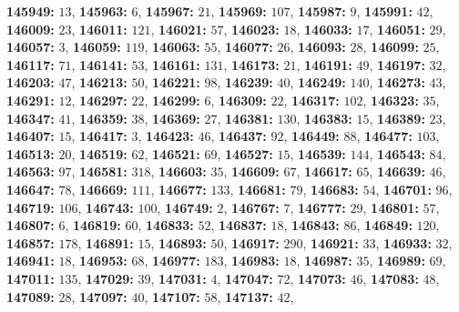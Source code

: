 \textsf{\bfseries 145949:} $13$, \textsf{\bfseries 145963:} $6$, \textsf{\bfseries 145967:} $21$, \textsf{\bfseries 145969:} $107$, \textsf{\bfseries 145987:} $9$, \textsf{\bfseries 145991:} $42$, \textsf{\bfseries 146009:} $23$, \textsf{\bfseries 146011:} $121$, \textsf{\bfseries 146021:} $57$, \textsf{\bfseries 146023:} $18$, \textsf{\bfseries 146033:} $17$, \textsf{\bfseries 146051:} $29$, \textsf{\bfseries 146057:} $3$, \textsf{\bfseries 146059:} $119$, \textsf{\bfseries 146063:} $55$, \textsf{\bfseries 146077:} $26$, \textsf{\bfseries 146093:} $28$, \textsf{\bfseries 146099:} $25$, \textsf{\bfseries 146117:} $71$, \textsf{\bfseries 146141:} $53$, \textsf{\bfseries 146161:} $131$, \textsf{\bfseries 146173:} $21$, \textsf{\bfseries 146191:} $49$, \textsf{\bfseries 146197:} $32$, \textsf{\bfseries 146203:} $47$, \textsf{\bfseries 146213:} $50$, \textsf{\bfseries 146221:} $98$, \textsf{\bfseries 146239:} $40$, \textsf{\bfseries 146249:} $140$, \textsf{\bfseries 146273:} $43$, \textsf{\bfseries 146291:} $12$, \textsf{\bfseries 146297:} $22$, \textsf{\bfseries 146299:} $6$, \textsf{\bfseries 146309:} $22$, \textsf{\bfseries 146317:} $102$, \textsf{\bfseries 146323:} $35$, \textsf{\bfseries 146347:} $41$, \textsf{\bfseries 146359:} $38$, \textsf{\bfseries 146369:} $27$, \textsf{\bfseries 146381:} $130$, \textsf{\bfseries 146383:} $15$, \textsf{\bfseries 146389:} $23$, \textsf{\bfseries 146407:} $15$, \textsf{\bfseries 146417:} $3$, \textsf{\bfseries 146423:} $46$, \textsf{\bfseries 146437:} $92$, \textsf{\bfseries 146449:} $88$, \textsf{\bfseries 146477:} $103$, \textsf{\bfseries 146513:} $20$, \textsf{\bfseries 146519:} $62$, \textsf{\bfseries 146521:} $69$, \textsf{\bfseries 146527:} $15$, \textsf{\bfseries 146539:} $144$, \textsf{\bfseries 146543:} $84$, \textsf{\bfseries 146563:} $97$, \textsf{\bfseries 146581:} $318$, \textsf{\bfseries 146603:} $35$, \textsf{\bfseries 146609:} $67$, \textsf{\bfseries 146617:} $65$, \textsf{\bfseries 146639:} $46$, \textsf{\bfseries 146647:} $78$, \textsf{\bfseries 146669:} $111$, \textsf{\bfseries 146677:} $133$, \textsf{\bfseries 146681:} $79$, \textsf{\bfseries 146683:} $54$, \textsf{\bfseries 146701:} $96$, \textsf{\bfseries 146719:} $106$, \textsf{\bfseries 146743:} $100$, \textsf{\bfseries 146749:} $2$, \textsf{\bfseries 146767:} $7$, \textsf{\bfseries 146777:} $29$, \textsf{\bfseries 146801:} $57$, \textsf{\bfseries 146807:} $6$, \textsf{\bfseries 146819:} $60$, \textsf{\bfseries 146833:} $52$, \textsf{\bfseries 146837:} $18$, \textsf{\bfseries 146843:} $86$, \textsf{\bfseries 146849:} $120$, \textsf{\bfseries 146857:} $178$, \textsf{\bfseries 146891:} $15$, \textsf{\bfseries 146893:} $50$, \textsf{\bfseries 146917:} $290$, \textsf{\bfseries 146921:} $33$, \textsf{\bfseries 146933:} $32$, \textsf{\bfseries 146941:} $18$, \textsf{\bfseries 146953:} $68$, \textsf{\bfseries 146977:} $183$, \textsf{\bfseries 146983:} $18$, \textsf{\bfseries 146987:} $35$, \textsf{\bfseries 146989:} $69$, \textsf{\bfseries 147011:} $135$, \textsf{\bfseries 147029:} $39$, \textsf{\bfseries 147031:} $4$, \textsf{\bfseries 147047:} $72$, \textsf{\bfseries 147073:} $46$, \textsf{\bfseries 147083:} $48$, \textsf{\bfseries 147089:} $28$, \textsf{\bfseries 147097:} $40$, \textsf{\bfseries 147107:} $58$, \textsf{\bfseries 147137:} $42$, 
